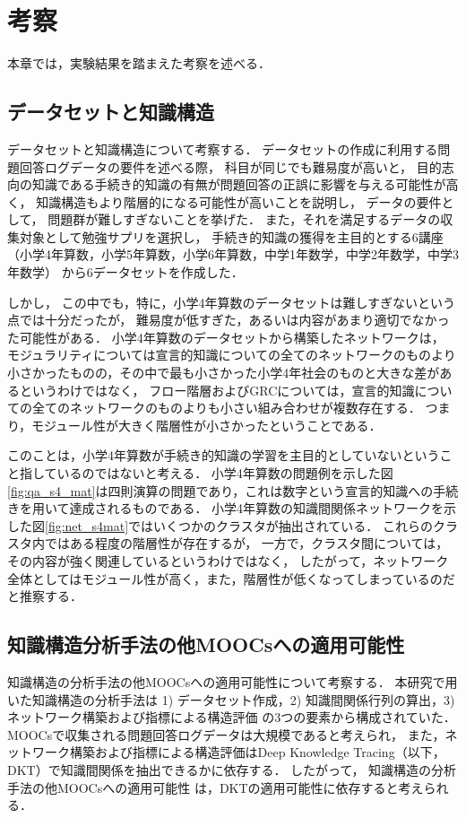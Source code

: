 \chapter{考察}
\label{chap:discussion}
\fancyhf{}
\rhead{\thepage}
\cfoot{\thepage}

本章では，実験結果を踏まえた考察を述べる．


\section{データセットと知識構造}
データセットと知識構造について考察する．
データセットの作成に利用する問題回答ログデータの要件を述べる際，
科目が同じでも難易度が高いと，
目的志向の知識である手続き的知識の有無が問題回答の正誤に影響を与える可能性が高く，
知識構造もより階層的になる可能性が高いことを説明し，
データの要件として，
問題群が難しすぎないことを挙げた．
また，それを満足するデータの収集対象として勉強サプリを選択し，
手続き的知識の獲得を主目的とする6講座（小学4年算数，小学5年算数，小学6年算数，中学1年数学，中学2年数学，中学3年数学）
から6データセットを作成した．

しかし，
この中でも，特に，小学4年算数のデータセットは難しすぎないという点では十分だったが，
難易度が低すぎた，あるいは内容があまり適切でなかった可能性がある．
小学4年算数のデータセットから構築したネットワークは，
モジュラリティについては宣言的知識についての全てのネットワークのものより小さかったものの，その中で最も小さかった小学4年社会のものと大きな差があるというわけではなく，
フロー階層およびGRCについては，宣言的知識についての全てのネットワークのものよりも小さい組み合わせが複数存在する．
つまり，モジュール性が大きく階層性が小さかったということである．

このことは，小学4年算数が手続き的知識の学習を主目的としていないということ指しているのではないと考える．
小学4年算数の問題例を示した図\ref{fig:qa_s4_mat}は四則演算の問題であり，これは数字という宣言的知識への手続きを用いて達成されるものである．
小学4年算数の知識間関係ネットワークを示した図\ref{fig:net_s4mat}ではいくつかのクラスタが抽出されている．
これらのクラスタ内ではある程度の階層性が存在するが，
一方で，クラスタ間については，その内容が強く関連しているというわけではなく，
したがって，ネットワーク全体としてはモジュール性が高く，また，階層性が低くなってしまっているのだと推察する．

\section{知識構造分析手法の他MOOCsへの適用可能性}
知識構造の分析手法の他MOOCsへの適用可能性について考察する．
本研究で用いた知識構造の分析手法は
1) データセット作成，2) 知識間関係行列の算出，3)ネットワーク構築および指標による構造評価
の3つの要素から構成されていた．
MOOCsで収集される問題回答ログデータは大規模であると考えられ，
また，ネットワーク構築および指標による構造評価はDeep Knowledge Tracing（以下，DKT）で知識間関係を抽出できるかに依存する．
したがって，
知識構造の分析手法の他MOOCsへの適用可能性
は，DKTの適用可能性に依存すると考えられる．

